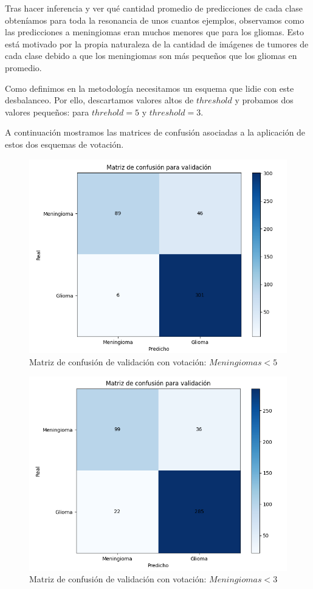 Tras hacer inferencia y ver qué cantidad promedio de predicciones de cada clase obteníamos para toda la resonancia de unos cuantos ejemplos, observamos como las predicciones a meningiomas eran muchos menores que para los gliomas. Esto está motivado por la propia naturaleza de la cantidad de imágenes de tumores de cada clase debido a que los meningiomas son más pequeños que los gliomas en promedio. 

Como definimos en la metodología necesitamos un esquema que lidie con este desbalanceo. Por ello, descartamos valores altos de $threshold$ y probamos dos valores pequeños: para $threhold = 5$ y $threshold = 3$.

A continuación mostramos las matrices de confusión asociadas a la aplicación de estos dos esquemas de votación.

\begin{figure}[H]
	\centering
	\includegraphics[width=0.7\linewidth]{imagenes/task1_val_5.png}
	\caption{Matriz de confusión de validación con votación: $Meningiomas < 5$}
\end{figure}

\begin{figure}[H]
	\centering
	\includegraphics[width=0.7\linewidth]{imagenes/task1_val_3.png}
	\caption{Matriz de confusión de validación con votación: $Meningiomas < 3$}
\end{figure}


